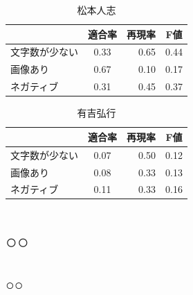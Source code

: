 \documentclass[dvipdfmx]{issj}
\begin{document}
\begin{table}[htb]
\centering
  \caption{松本人志}
  \begin{tabular}{|l||c|r|c|}  \hline
& 適合率 & 再現率 & F値 \\ \hline \hline
 文字数が少ない & 0.33&0.65&0.44 \\ \hline
  画像あり & 0.67&0.10&0.17 \\ \hline
   ネガティブ &0.31&0.45&0.37 \\ \hline
  \end{tabular}
\end{table}


\begin{table}[htb]
\centering
  \caption{有吉弘行}
  \begin{tabular}{|l||c|r|c|}  \hline
& 適合率 & 再現率 & F値 \\ \hline \hline
 文字数が少ない &0.07&0.50&0.12 \\ \hline
  画像あり &0.08&0.33&0.13 \\ \hline
   ネガティブ &0.11&0.33&0.16 \\ \hline
  \end{tabular}
\end{table}
\section{○○}  %
\subsection{○○}  %


\end{document}
